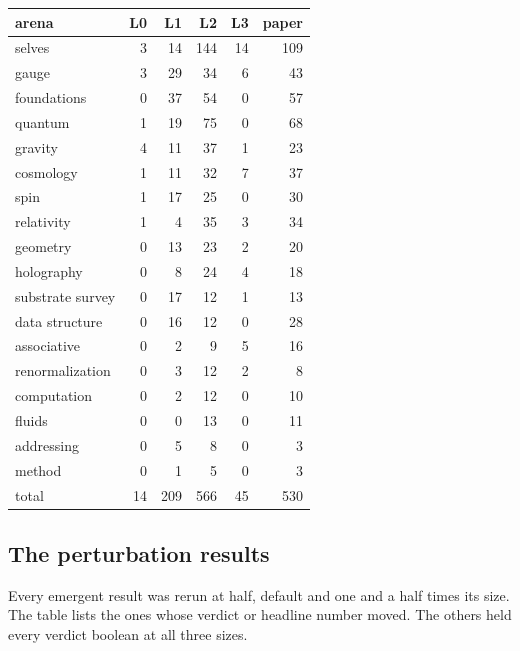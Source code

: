 \begin{center}
\begin{tabular}{@{}lrrrrr@{}}
\toprule
arena & L0 & L1 & L2 & L3 & paper \\
\midrule
selves & 3 & 14 & 144 & 14 & 109 \\
gauge & 3 & 29 & 34 & 6 & 43 \\
foundations & 0 & 37 & 54 & 0 & 57 \\
quantum & 1 & 19 & 75 & 0 & 68 \\
gravity & 4 & 11 & 37 & 1 & 23 \\
cosmology & 1 & 11 & 32 & 7 & 37 \\
spin & 1 & 17 & 25 & 0 & 30 \\
relativity & 1 & 4 & 35 & 3 & 34 \\
geometry & 0 & 13 & 23 & 2 & 20 \\
holography & 0 & 8 & 24 & 4 & 18 \\
substrate survey & 0 & 17 & 12 & 1 & 13 \\
data structure & 0 & 16 & 12 & 0 & 28 \\
associative & 0 & 2 & 9 & 5 & 16 \\
renormalization & 0 & 3 & 12 & 2 & 8 \\
computation & 0 & 2 & 12 & 0 & 10 \\
fluids & 0 & 0 & 13 & 0 & 11 \\
addressing & 0 & 5 & 8 & 0 & 3 \\
method & 0 & 1 & 5 & 0 & 3 \\
\midrule
total & 14 & 209 & 566 & 45 & 530 \\
\bottomrule
\end{tabular}
\end{center}

\subsection{The perturbation results}

Every emergent result was rerun at half, default and one and a half times its size. The table lists the ones whose
verdict or headline number moved. The others held every verdict boolean at all three sizes.

